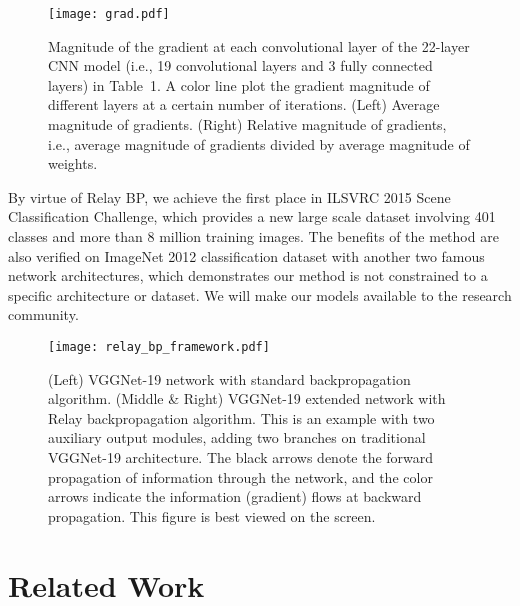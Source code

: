 \documentclass[runningheads]{llncs}
\begin{document}
\begin{figure}
\setlength{\abovecaptionskip}{0pt}
\begin{center}
\texttt{[image: grad.pdf]}
\end{center}
\caption{Magnitude of the gradient at each convolutional layer of the 22-layer CNN model (i.e., 19 convolutional layers and 3 fully connected layers) in Table~1. A color line plot the gradient magnitude of different layers at a certain number of iterations. (Left) Average magnitude of gradients. (Right) Relative magnitude of gradients, i.e., average magnitude of gradients divided by average magnitude of weights.}
\label{fig:gradient_vanishing}
\end{figure}

By virtue of Relay BP, we achieve the first place in ILSVRC 2015 Scene Classification Challenge, which provides a new large scale dataset involving 401 classes and more than 8 million training images. The benefits of the method are also verified on ImageNet 2012 classification dataset with another two famous network architectures, which demonstrates our method is not constrained to a specific architecture or dataset. We will make our models available to the research community.

\begin{figure}
\setlength{\abovecaptionskip}{0pt}
\begin{center}
\texttt{[image: relay\_bp\_framework.pdf]}
\end{center}
\caption{(Left) VGGNet-19 network \cite{simonyan_iclr2015} with standard backpropagation algorithm. (Middle \& Right) VGGNet-19 extended network with Relay backpropagation algorithm. This is an example with two auxiliary output modules, adding two branches on traditional VGGNet-19 architecture. The black arrows denote the forward propagation of information through the network, and the color arrows indicate the information (gradient) flows at backward propagation. This figure is best viewed on the screen.}
\label{fig:relay_bp_framework}
\end{figure}

\section{Related Work}
\end{document}
